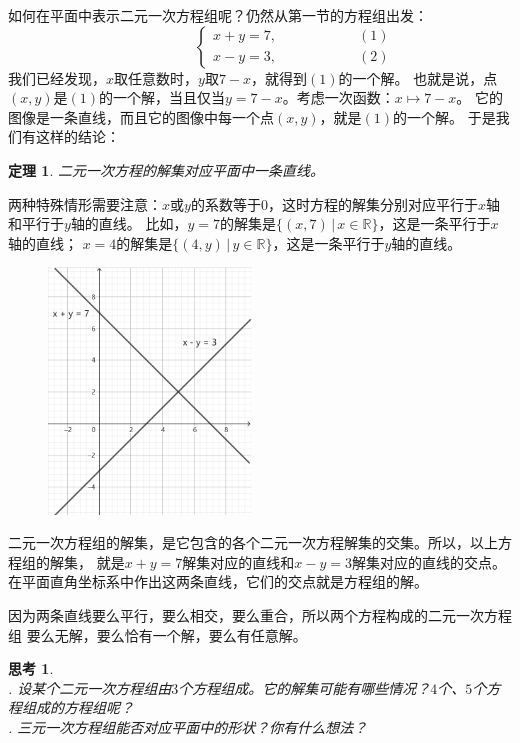 \documentclass[12pt,UTF8]{ctexbook}
\newtheorem{tm}{定理}[section]
\newtheorem{sk}{思考}[section]
\begin{document}
如何在平面中表示二元一次方程组呢？仍然从第一节的方程组出发：
$$ \quad \quad \quad \quad \quad\left\{
\begin{array}{cr}
     x + y = 7, & \quad \quad \quad \quad \quad (1) \\
     x - y = 3, & \quad \quad \quad \quad \quad (2)
\end{array}\right.
$$
我们已经发现，$x$取任意数时，$y$取$7 - x$，就得到$(1)$的一个解。
也就是说，点$(x, y)$是$(1)$的一个解，当且仅当$y = 7 - x$。考虑一次函数：$x \mapsto 7 - x$。
它的图像是一条直线，而且它的图像中每一个点$(x, y)$，就是$(1)$的一个解。
于是我们有这样的结论：
\begin{tm}
    二元一次方程的解集对应平面中一条直线。
\end{tm}
两种特殊情形需要注意：$x$或$y$的系数等于$0$，这时方程的解集分别对应平行于$x$轴和平行于$y$轴的直线。
比如，$y = 7$的解集是$\{(x, 7) \,|\, x\in\mathbb{R}\}$，这是一条平行于$x$轴的直线；
$x = 4$的解集是$\{(4, y) \,|\, y\in\mathbb{R}\}$，这是一条平行于$y$轴的直线。

\begin{figure} %
    \vspace{-15pt}
    \flushright
    \includegraphics[width=0.48\textwidth]{二元一次方程组.png}
\end{figure}

二元一次方程组的解集，是它包含的各个二元一次方程解集的交集。所以，以上方程组的解集，
就是$x + y = 7$解集对应的直线和$x - y = 3$解集对应的直线的交点。
在平面直角坐标系中作出这两条直线，它们的交点就是方程组的解。

因为两条直线要么平行，要么相交，要么重合，所以两个方程构成的二元一次方程组
要么无解，要么恰有一个解，要么有任意解。

\begin{sk}\label{sk:6-3-0}
    \mbox{}\\
    . 设某个二元一次方程组由$3$个方程组成。它的解集可能有哪些情况？$4$个、$5$个方程组成的方程组呢？\\
    . 三元一次方程组能否对应平面中的形状？你有什么想法？
\end{sk}
\end{document}
